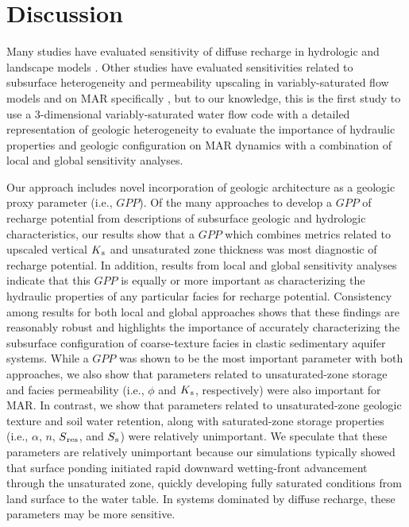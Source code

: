 \section{Discussion} \label{Discussion}

Many studies have evaluated sensitivity of diffuse recharge in hydrologic and landscape models \citep[e.g., ][]{hartmann2017enhanced, mccallum2010impacts}. Other studies have evaluated sensitivities related to subsurface heterogeneity and permeability upscaling in variably-saturated flow models \citep[e.g.,][]{gilbert2016global,foster2019sensitivity,srivastava2014insights} and on MAR specifically \citep[e.g.,][]{rahman2013integrated,heilweil2015variably}, but to our knowledge, this is the first study to use a 3-dimensional variably-saturated water flow code with a detailed representation of geologic heterogeneity to evaluate the importance of hydraulic properties and geologic configuration on MAR dynamics with a combination of local and global sensitivity analyses.

Our approach includes novel incorporation of geologic architecture as a geologic proxy parameter (i.e., $GPP$). Of the many approaches to develop a $GPP$ of recharge potential from descriptions of subsurface geologic and hydrologic characteristics, our results show that a $GPP$ which combines metrics related to upscaled vertical $K\textsubscript{s}$ and unsaturated zone thickness was most diagnostic of recharge potential. In addition, results from local and global sensitivity analyses indicate that this $GPP$ is equally or more important as characterizing the hydraulic properties of any particular facies for recharge potential. Consistency among results for both local and global approaches shows that these findings are reasonably robust and highlights the importance of accurately characterizing the subsurface configuration of coarse-texture facies in clastic sedimentary aquifer systems. While a $GPP$ was shown to be the most important parameter with both approaches, we also show that parameters related to unsaturated-zone storage and facies permeability (i.e., $\phi$ and $K\textsubscript{s}$, respectively) were also important for MAR. In contrast, we show that parameters related to unsaturated-zone geologic texture and soil water retention, along with saturated-zone storage properties (i.e., $\alpha$, $n$, $S\textsubscript{res}$, and $S\textsubscript{s}$) were relatively unimportant. We speculate that these parameters are relatively unimportant because our simulations typically showed that surface ponding initiated rapid downward wetting-front advancement through the unsaturated zone, quickly developing fully saturated conditions from land surface to the water table. In systems dominated by diffuse recharge, these parameters may be more sensitive.

